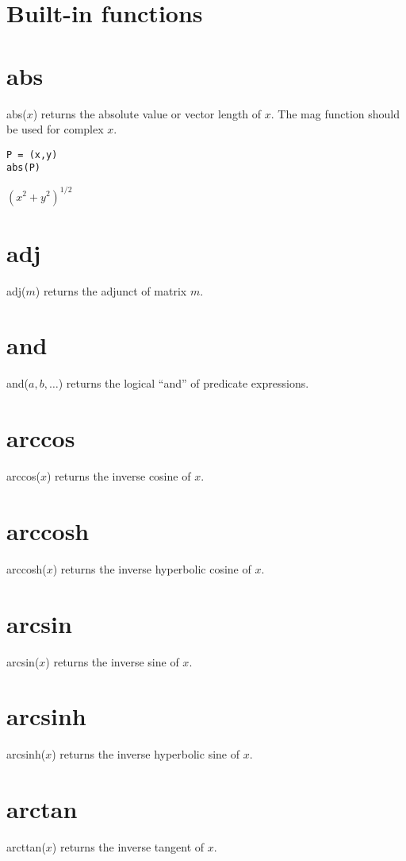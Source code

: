 \section{Built-in functions}

\section*{abs}
abs($x$) returns the absolute value or vector length of $x$.
The mag function should be used for complex $x$.

\begin{Verbatim}[formatcom=\color{blue},samepage=true]
P = (x,y)
abs(P)
\end{Verbatim}

$\displaystyle (x^2+y^2)^{1/2}$

\section*{adj}
adj($m$) returns the adjunct of matrix $m$.

\section*{and}
and($a,b,\ldots$) returns the logical ``and'' of predicate expressions.

\section*{arccos}
arccos($x$) returns the inverse cosine of $x$.

\section*{arccosh}
arccosh($x$) returns the inverse hyperbolic cosine of $x$.

\section*{arcsin}
arcsin($x$) returns the inverse sine of $x$.

\section*{arcsinh}
arcsinh($x$) returns the inverse hyperbolic sine of $x$.

\section*{arctan}
arcttan($x$) returns the inverse tangent of $x$.

